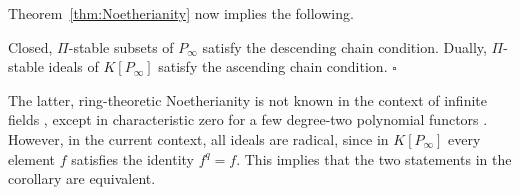 \documentclass{amsart}
\begin{document}
Theorem~\ref{thm:Noetherianity} now implies the following.

\begin{cor}
Closed, $\Pi$-stable subsets of $P_\infty$ satisfy the descending chain
condition. Dually, $\Pi$-stable ideals of $K[P_\infty]$ satisfy the
ascending chain condition. \hfill $\square$
\end{cor}

The latter, ring-theoretic Noetherianity is not known in the context
of infinite fields \cite{Draisma17}, except in characteristic zero for
a few degree-two polynomial functors \cite{Nagpal15,Sam22}. However,
in the current context, all ideals are radical, since in $K[P_\infty]$
every element $f$ satisfies the identity $f^q=f$. This implies that the
two statements in the corollary are equivalent.



\end{document}
